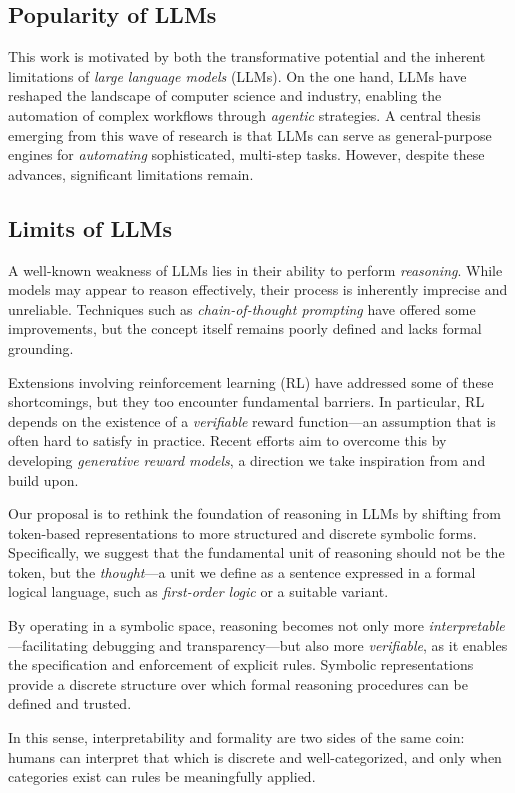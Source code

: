 \label{sec:contributions}
\subsection{Popularity of LLMs}

This work is motivated by both the transformative potential and the inherent limitations of {\em large language models} (LLMs). On the one hand, LLMs have reshaped the landscape of computer science and industry, enabling the automation of complex workflows through {\em agentic} strategies. A central thesis emerging from this wave of research is that LLMs can serve as general-purpose engines for {\em automating} sophisticated, multi-step tasks. However, despite these advances, significant limitations remain.

\subsection{Limits of LLMs}

A well-known weakness of LLMs lies in their ability to perform {\em reasoning}. While models may appear to reason effectively, their process is inherently imprecise and unreliable. Techniques such as {\em chain-of-thought prompting} have offered some improvements, but the concept itself remains poorly defined and lacks formal grounding.

Extensions involving reinforcement learning (RL) have addressed some of these shortcomings, but they too encounter fundamental barriers. In particular, RL depends on the existence of a {\em verifiable} reward function—an assumption that is often hard to satisfy in practice. Recent efforts aim to overcome this by developing {\em generative reward models}, a direction we take inspiration from and build upon.

Our proposal is to rethink the foundation of reasoning in LLMs by shifting from token-based representations to more structured and discrete symbolic forms. Specifically, we suggest that the fundamental unit of reasoning should not be the token, but the {\em thought}—a unit we define as a sentence expressed in a formal logical language, such as {\em first-order logic} or a suitable variant. 

By operating in a symbolic space, reasoning becomes not only more {\em interpretable}—facilitating debugging and transparency—but also more {\em verifiable}, as it enables the specification and enforcement of explicit rules. Symbolic representations provide a discrete structure over which formal reasoning procedures can be defined and trusted.

In this sense, interpretability and formality are two sides of the same coin: humans can interpret that which is discrete and well-categorized, and only when categories exist can rules be meaningfully applied.
